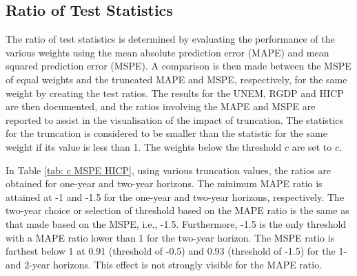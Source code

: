 \documentclass[11pt]{article}
\begin{document}
	\subsection{Ratio of Test Statistics}\label{ratio-of-test-statistics}
	The ratio of test statistics is determined by evaluating the performance of the various weights using the mean absolute prediction error (MAPE) and mean squared prediction error (MSPE). A comparison is then made between the MSPE of equal weights and the truncated MAPE and MSPE, respectively, for the same weight by creating the test ratios. The results for the UNEM, RGDP and HICP are then documented, and the ratios involving the MAPE and MSPE are reported to assist in the visualisation of the impact of truncation. The statistics for the truncation is considered to be smaller than the statistic for the same weight if its value is less than 1. The weights below the threshold $c$ are set to $c$.
	
	In Table \ref{tab: c MSPE HICP},  using various truncation values, the ratios are obtained for one-year and two-year horizons. The minimum MAPE ratio is attained at -1 and -1.5 for the one-year and two-year horizons, respectively. The two-year choice or selection of threshold based on the MAPE ratio is the same as that made based on the MSPE, i.e., -1.5. Furthermore, -1.5 is the only threshold with a MAPE ratio lower than 1 for the two-year horizon. The MSPE ratio is farthest below 1 at 0.91 (threshold of -0.5) and 0.93 (threshold of -1.5) for the 1- and 2-year horizons. This effect is not strongly visible for the MAPE ratio.
	
\end{document}
